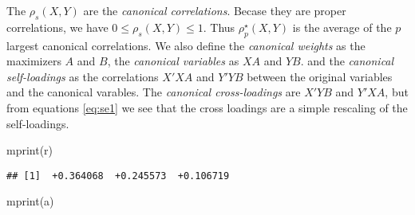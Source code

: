 \documentclass[
  12pt,
]{article}
\newenvironment{Shaded}{\begin{snugshade}}{\end{snugshade}}
\newcommand{\DecValTok}[1]{\textcolor[rgb]{0.00,0.00,0.81}{#1}}
\newcommand{\FunctionTok}[1]{\textcolor[rgb]{0.00,0.00,0.00}{#1}}
\newcommand{\NormalTok}[1]{#1}
\newcommand{\OtherTok}[1]{\textcolor[rgb]{0.56,0.35,0.01}{#1}}
\newcommand{\SpecialCharTok}[1]{\textcolor[rgb]{0.00,0.00,0.00}{#1}}
\begin{document}
The \(\rho_s(X,Y)\) are the \emph{canonical correlations}. Becase they are proper correlations, we have \(0\leq\rho_s(X,Y)\leq 1\). Thus \(\rho_p^\star(X,Y)\) is the average of the \(p\) largest canonical correlations. We also define the \emph{canonical weights} as the maximizers \(A\) and \(B\), the \emph{canonical variables} as \(XA\) and \(YB\). and the \emph{canonical self-loadings} as the correlations \(X'XA\) and \(Y'YB\) between the original variables and the canonical varables. The \emph{canonical cross-loadings} are \(X'YB\) and \(Y'XA\), but from equations \eqref{eq:se1} we see that the cross loadings are a simple rescaling of the self-loadings.

\begin{Shaded}
\end{Shaded}

\begin{Shaded}
\begin{Highlighting}[]
\FunctionTok{mprint}\NormalTok{(r)}
\end{Highlighting}
\end{Shaded}

\begin{verbatim}
## [1]  +0.364068  +0.245573  +0.106719
\end{verbatim}

\begin{Shaded}
\begin{Highlighting}[]
\FunctionTok{mprint}\NormalTok{(a)}
\end{Highlighting}
\end{Shaded}
\end{document}
